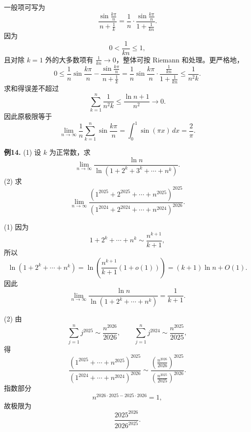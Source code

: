 \begin{solutionblock}

一般项可写为
\[
\frac{\sin\frac{k\pi}{n}}{n+\frac1k}
=\frac1n\cdot
\frac{\sin\frac{k\pi}{n}}{1+\frac1{kn}}.
\]
因为
\[
0<\frac1{kn}\le1,
\]
且对除 \(k=1\) 外的大多数项有 \(\frac1{kn}\to0\)，整体可按 Riemann 和处理。更严格地，
\[
0\le
\frac1n\sin\frac{k\pi}{n}
-\frac{\sin\frac{k\pi}{n}}{n+\frac1k}
=\frac1n\sin\frac{k\pi}{n}\cdot
\frac{\frac1{kn}}{1+\frac1{kn}}
\le \frac1{n^2k}.
\]
求和得误差不超过
\[
\sum_{k=1}^n\frac1{n^2k}\le\frac{\ln n+1}{n^2}\to0.
\]
因此原极限等于
\[
\lim_{n\to\infty}\frac1n\sum_{k=1}^n\sin\frac{k\pi}{n}
=\int_0^1\sin(\pi x)\,dx
=\frac2\pi.
\]

\end{solutionblock}

\begin{problemblock}
\textbf{例14.} (1) 设 \(k\) 为正常数，求
\[
\lim_{n\to\infty}
\frac{\ln n}{\ln(1+2^k+3^k+\cdots+n^k)}.
\]
(2) 求
\[
\lim_{n\to\infty}
\frac{(1^{2025}+2^{2025}+\cdots+n^{2025})^{2025}}
{(1^{2024}+2^{2024}+\cdots+n^{2024})^{2026}}.
\]
\end{problemblock}

\begin{solutionblock}

(1) 因为
\[
1+2^k+\cdots+n^k\sim\frac{n^{k+1}}{k+1},
\]
所以
\[
\ln(1+2^k+\cdots+n^k)
=\ln\left(\frac{n^{k+1}}{k+1}(1+o(1))\right)
=(k+1)\ln n+O(1).
\]
因此
\[
\lim_{n\to\infty}
\frac{\ln n}{\ln(1+2^k+\cdots+n^k)}
=\frac1{k+1}.
\]

(2) 由
\[
\sum_{j=1}^n j^{2025}\sim\frac{n^{2026}}{2026},\qquad
\sum_{j=1}^n j^{2024}\sim\frac{n^{2025}}{2025},
\]
得
\[
\frac{(1^{2025}+\cdots+n^{2025})^{2025}}
{(1^{2024}+\cdots+n^{2024})^{2026}}
\sim
\frac{\left(\frac{n^{2026}}{2026}\right)^{2025}}
{\left(\frac{n^{2025}}{2025}\right)^{2026}}.
\]
指数部分
\[
n^{2026\cdot2025-2025\cdot2026}=1,
\]
故极限为
\[
\frac{2025^{2026}}{2026^{2025}}.
\]

\end{solutionblock}

